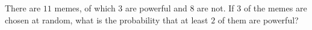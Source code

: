 There are $11$ memes, of which $3$ are powerful and $8$ are not. If $3$ of the memes are chosen at random, what is the probability that at least $2$ of them are powerful?
